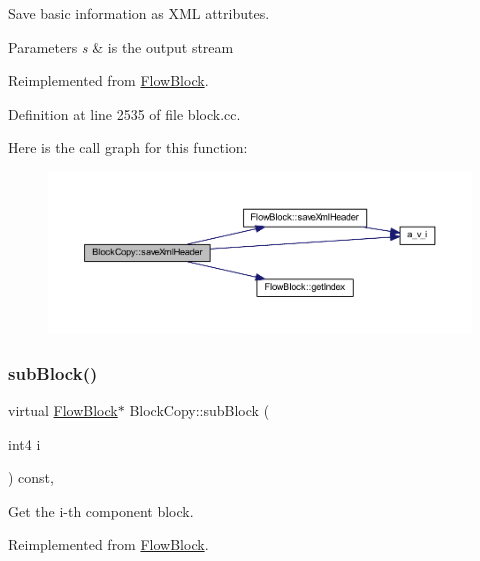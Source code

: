 Save basic information as X\+ML attributes. 


\begin{DoxyParams}{Parameters}
{\em s} & is the output stream \\
\hline
\end{DoxyParams}


Reimplemented from \mbox{\hyperlink{class_flow_block_a6cf95f66e3f6940a8342b3e6fdfc5ca2}{Flow\+Block}}.



Definition at line 2535 of file block.\+cc.

Here is the call graph for this function\+:
\nopagebreak
\begin{figure}[H]
\begin{center}
\leavevmode
\includegraphics[width=350pt]{class_block_copy_a67aa0188bb62e91052092088eeec70ed_cgraph}
\end{center}
\end{figure}
\mbox{\label{class_block_copy_ae8eff265a0d9da347eda0042796c058b}} 
\subsubsection{\texorpdfstring{subBlock()}{subBlock()}}
{\footnotesize\ttfamily virtual \mbox{\hyperlink{class_flow_block}{Flow\+Block}}$\ast$ Block\+Copy\+::sub\+Block (\begin{DoxyParamCaption}\item[{int4}]{i }\end{DoxyParamCaption}) const\hspace{0.3cm}{\ttfamily [inline]}, {\ttfamily [virtual]}}



Get the i-\/th component block. 



Reimplemented from \mbox{\hyperlink{class_flow_block_a42070515fd8db6cc23916b359e259f4e}{Flow\+Block}}.



